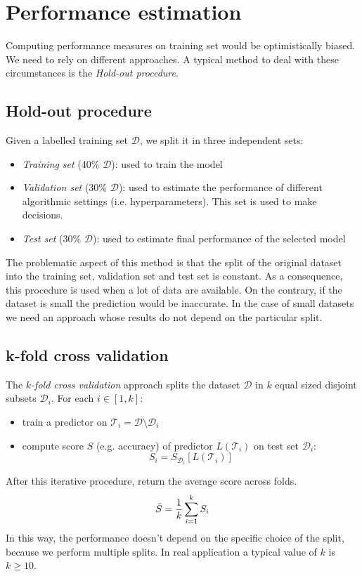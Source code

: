 \section{Performance estimation}
Computing performance measures on training set would be optimistically biased. We need to rely on different approaches. A typical method to deal with these circumstances is the \textit{Hold-out procedure}.

\subsection{Hold-out procedure}
Given a labelled training set $\mathcal{D}$, we split it in three independent sets:
\begin{itemize}
    \item \textit{Training set} (40\% $\mathcal{D}$): used to train the model
    \item \textit{Validation set} (30\% $\mathcal{D}$): used to estimate the performance of different algorithmic settings (i.e. hyperparameters). This set is used to make decisions.
    \item \textit{Test set} (30\% $\mathcal{D}$): used to estimate final performance of the selected model
\end{itemize}

The problematic aspect of this method is that the split of the original dataset into the training set, validation set and test set is constant. As a consequence, this procedure is used when a lot of data are available. On the contrary, if the dataset is small the prediction would be inaccurate. In the case of small datasets we need an approach whose results do not depend on the particular split.

\subsection{k-fold cross validation}
The \textit{$k$-fold cross validation} approach splits the dataset $\mathcal{D}$ in $k$ equal sized disjoint subsets $\mathcal{D}_i$. For each $i \in [1,k]$:
\begin{itemize}
    \item train a predictor on $\mathcal{T}_i = \mathcal{D} \setminus \mathcal{D}_i$
    \item compute score $S$ (e.g. accuracy) of predictor $L(\mathcal{T}_i)$ on test set $\mathcal{D}_i$:
    $$S_i = S_{\mathcal{D}_i}[L(\mathcal{T}_i)]$$
\end{itemize}
After this iterative procedure, return the average score across folds.
$$\Bar{S} = \frac{1}{k} \sum_{i=1}^k S_i$$
In this way, the performance doesn't depend on the specific choice of the split, because we perform multiple splits. In real application a typical value of $k$ is $k \geq 10$. \newline

